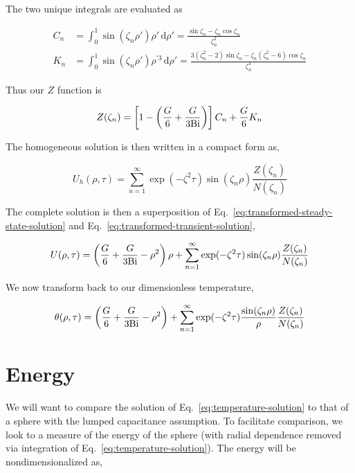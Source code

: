 The two unique integrals are evaluated as

\begin{align*}
    C_n &= \int_0^1\sin(\zeta_n\rho')\rho' \,\mathrm{d}\rho'  = \frac{\sin\zeta_n-\zeta_n\cos\zeta_n}{\zeta_n^2}\\
    K_n &= \int_0^1\sin(\zeta_n\rho')\rho^{'3} \,\mathrm{d}\rho'  = \frac{3(\zeta_n^2-2)\sin\zeta_n - \zeta_n(\zeta_n^2-6)\cos\zeta_n}{\zeta_n^4}
\end{align*}

Thus our $Z$ function is

\begin{equation}
    Z(\zeta_n) = \left[1  - \left(\frac{G}{6} + \frac{G}{3\mathrm{Bi}}\right)\right]C_n + \frac{G}{6}K_n
\end{equation}

The homogeneous solution is then written in a compact form as,

\begin{equation}\label{eq:transformed-transient-solution}
    U_h(\rho,\tau) = \sum_{n=1}^\infty \exp(-\zeta^2 \tau) \sin(\zeta_n \rho) \frac{Z(\zeta_n)}{N(\zeta_n)} 
\end{equation}

The complete solution is then a superposition of Eq.~\ref{eq:transformed-steady-state-solution} and Eq.~\ref{eq:transformed-transient-solution},

\begin{equation}
    U(\rho,\tau) = \left(\frac{G}{6} + \frac{G}{3\mathrm{Bi}}-\rho^2\right)\rho  +   \sum_{n=1}^\infty \exp(-\zeta^2 \tau) \sin(\zeta_n \rho) \frac{Z(\zeta_n)}{N(\zeta_n)} 
\end{equation}

We now transform back to our dimensionless temperature,

\begin{equation}\label{eq:temperature-solution}
    \theta(\rho,\tau) = \left(\frac{G}{6} + \frac{G}{3\mathrm{Bi}}-\rho^2\right)  +   \sum_{n=1}^\infty \exp(-\zeta^2 \tau) \frac{\sin(\zeta_n \rho)}{\rho} \frac{Z(\zeta_n)}{N(\zeta_n)}  
\end{equation}


\section{Energy}

We will want to compare the solution of Eq.~\ref{eq:temperature-solution} to that of a sphere with the lumped capacitance assumption. To facilitate comparison, we look to a measure of the energy of the sphere (with radial dependence removed via integration of Eq.~\ref{eq:temperature-solution}). The energy will be nondimensionalized as,

